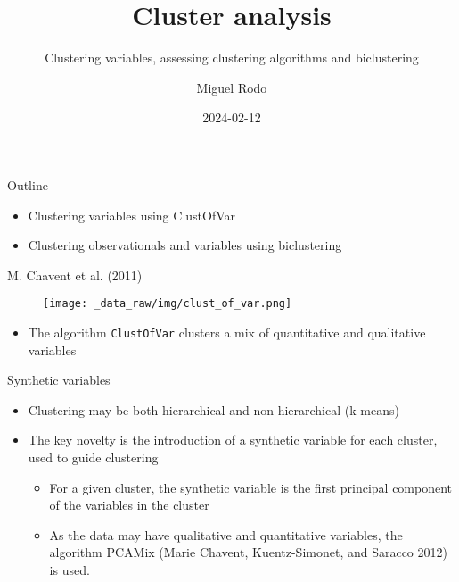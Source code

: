 \documentclass[
  ignorenonframetext,
  aspectratio=169,
]{beamer}
\title{Cluster analysis}
\subtitle{Clustering variables, assessing clustering algorithms and
biclustering}
\author{Miguel Rodo}
\date{2024-02-12}
\providecommand{\tightlist}{%
  \setlength{\itemsep}{0pt}\setlength{\parskip}{0pt}}\usepackage{longtable,booktabs,array}
\begin{document}
\frame{\titlepage}
\ifdefined\Shaded\renewenvironment{Shaded}{\begin{tcolorbox}[interior hidden, sharp corners, breakable, enhanced, boxrule=0pt, frame hidden, borderline west={3pt}{0pt}{shadecolor}]}{\end{tcolorbox}}\fi

\begin{frame}{Outline}
\protect\hypertarget{outline}{}
\begin{itemize}
\tightlist
\item
  Clustering variables using ClustOfVar
\item
  Clustering observationals and variables using biclustering
\end{itemize}
\end{frame}

\begin{frame}[fragile]{M. Chavent et al. (2011)}
\protect\hypertarget{chavent_etal11}{}
\begin{figure}[H]
\centering
\texttt{[image: \_data\_raw/img/clust\_of\_var.png]}
\end{figure}

\begin{itemize}
\tightlist
\item
  The algorithm \texttt{ClustOfVar} clusters a mix of quantitative and
  qualitative variables
\end{itemize}
\end{frame}

\begin{frame}{Synthetic variables}
\protect\hypertarget{synthetic-variables}{}
\begin{itemize}
\tightlist
\item
  Clustering may be both hierarchical and non-hierarchical (k-means)
\item
  The key novelty is the introduction of a synthetic variable for each
  cluster, used to guide clustering

  \begin{itemize}
  \tightlist
  \item
    For a given cluster, the synthetic variable is the first principal
    component of the variables in the cluster
  \item
    As the data may have qualitative and quantitative variables, the
    algorithm PCAMix (Marie Chavent, Kuentz-Simonet, and Saracco 2012)
    is used.
  \end{itemize}
\end{itemize}
\end{frame}
\end{document}
